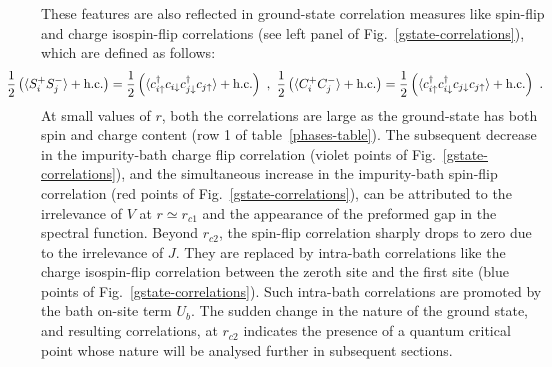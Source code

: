 \documentclass{iopart}
\begin{document}
These features are also reflected in ground-state correlation measures like spin-flip and charge isospin-flip correlations (see left panel of Fig.~\eqref{gstate-correlations}), which are defined as follows:
\begin{eqnarray}
\hspace*{-1cm}
\frac{1}{2}\left(\braket{S_{i}^{+}S_{j}^{-}} + \text{h.c.}\right) = \frac{1}{2}\left(\braket{c^\dagger_{i \uparrow}c_{i \downarrow}c^\dagger_{j \downarrow}c_{j \uparrow}} + \text{h.c.}\right)~,~
\frac{1}{2}\left(\braket{C_{i}^{+}C_{j}^{-}} + \text{h.c.}\right) = \frac{1}{2}\left(\braket{c^\dagger_{i \uparrow}c^\dagger_{i \downarrow}c_{j \downarrow}c_{j \uparrow}} + \text{h.c.}\right)~.
\end{eqnarray}
At small values of \(r\), both the correlations are large as the ground-state has both spin and charge content (row 1 of table~\eqref{phases-table}). The subsequent decrease in the impurity-bath charge flip correlation (violet points of Fig.~\eqref{gstate-correlations}), and the simultaneous increase in the impurity-bath spin-flip correlation (red points of Fig.~\eqref{gstate-correlations}), can be attributed to the irrelevance of \(V\) at \(r\simeq r_{c1}\) and the appearance of the preformed gap in the spectral function. Beyond \(r_{c2}\), the spin-flip correlation sharply drops to zero due to the irrelevance of \(J\). They are replaced by intra-bath correlations like the charge isospin-flip correlation between the zeroth site and the first site (blue points of Fig.~\eqref{gstate-correlations}). Such intra-bath correlations are promoted by the bath on-site term \(U_b\). The sudden change in the nature of the ground state, and resulting correlations, at $r_{c2}$ indicates the presence of a quantum critical point whose nature will be analysed further in subsequent sections. 
\end{document}
